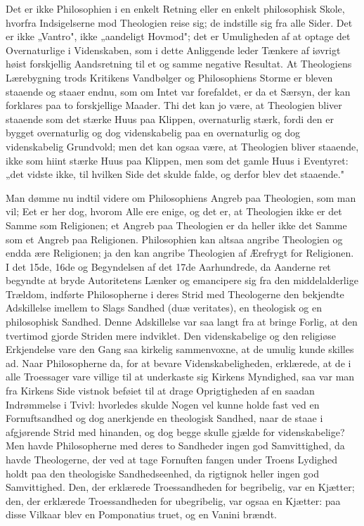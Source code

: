 \documentclass[12pt]{book}
\begin{document}
Det er ikke Philosophien i en enkelt Retning eller en enkelt philosophisk Skole,
hvorfra Indsigelserne mod Theologien reise sig; de indstille sig fra alle Sider.
Det er ikke „Vantro", ikke „aandeligt Hovmod"; det er Umuligheden af at optage det
Overnaturlige i Videnskaben, som i dette Anliggende leder Tænkere af iøvrigt høist
forskjellig Aandsretning til et og samme negative Resultat. At Theologiens
Lærebygning trods Kritikens Vandbølger og Philosophiens Storme er bleven staaende
og staaer endnu, som om Intet var forefaldet, er da et Særsyn, der kan forklares
paa to forskjellige Maader. Thi det kan jo være, at Theologien bliver staaende som
det stærke Huus paa Klippen, overnaturlig stærk, fordi den er bygget overnaturlig
og dog videnskabelig paa en overnaturlig og dog videnskabelig Grundvold; men det
kan ogsaa være, at Theologien bliver staaende, ikke som hiint stærke Huus paa
Klippen, men som det
gamle Huus i Eventyret: „det vidste ikke, til hvilken Side det skulde falde, og
derfor blev det staaende."

Man dømme nu indtil videre om Philosophiens Angreb paa Theologien, som man vil; Eet
er her dog, hvorom Alle ere enige, og det er, at Theologien ikke er det Samme som
Religionen; et Angreb paa Theologien er da heller ikke det Samme som et Angreb paa
Religionen. Philosophien kan altsaa angribe Theologien og endda ære Religionen; ja
den kan angribe Theologien af Ærefrygt for Religionen. I det 15de, 16de og
Begyndelsen af det 17de Aarhundrede, da Aanderne ret begyndte at bryde Autoritetens
Lænker og emancipere sig fra den middelalderlige Trældom, indførte Philosopherne i
deres Strid med Theologerne den bekjendte Adskillelse imellem to Slags Sandhed (duæ
veritates), en theologisk og en philosophisk Sandhed. Denne Adskillelse var saa
langt fra at bringe Forlig, at den tvertimod gjorde Striden mere indviklet. Den
videnskabelige og den religiøse Erkjendelse vare den Gang saa kirkelig
sammenvoxne, at de umulig kunde skilles ad. Naar Philosopherne da, for at bevare
Videnskabeligheden, erklærede, at de i alle Troessager vare villige til at
underkaste sig Kirkens Myndighed, saa var man fra Kirkens Side vistnok beføiet til
at drage Oprigtigheden af en saadan Indrømmelse i Tvivl: hvorledes skulde Nogen vel
kunne holde fast ved en Fornuftsandhed og dog anerkjende en theologisk Sandhed,
naar de staae i afgjørende Strid med hinanden, og dog begge skulle gjælde for
videnskabelige? Men havde Philosopherne med deres to Sandheder ingen god
Samvittighed, da havde Theologerne, der ved at tage Fornuften fangen under Troens
Lydighed holdt paa den theologiske Sandhedseenhed, da rigtignok heller ingen god
Samvittighed. Den, der erklærede Troessandheden for begribelig, var en Kjætter;
den, der erklærede
Troessandheden for ubegribelig, var ogsaa en Kjætter: paa disse Vilkaar blev en
Pomponatius truet, og en Vanini brændt.
\end{document}
